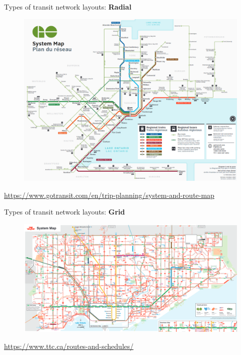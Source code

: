\documentclass[aspectratio=169]{beamer}
\begin{document}
\begin{frame}
\begin{columns}
\begin{column}{0.5\textwidth}
		\end{column}
		
	\end{columns}
	
\end{frame}




\begin{frame}
	
	Types of transit network layouts: \textbf{Radial}
	
	\begin{figure}
		\centering
		\includegraphics[width=0.7\linewidth]{images/go_map.png}
	\end{figure}

	\tiny\url{https://www.gotransit.com/en/trip-planning/system-and-route-map}
	
\end{frame}



\begin{frame}
	
	Types of transit network layouts: \textbf{Grid}
	
	\begin{figure}
		\centering
		\includegraphics[width=1\linewidth]{images/ttc-map.png}
	\end{figure}

	\tiny\url{https://www.ttc.ca/routes-and-schedules/}
	
\end{frame}
\end{document}
